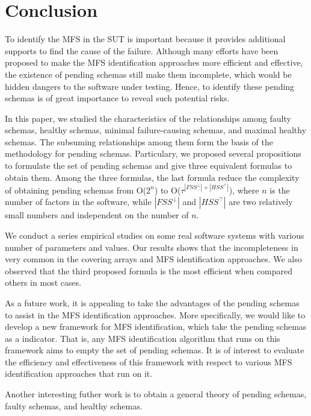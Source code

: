 {\section{Conclusion}\label{sec:conclusion}
To identify the MFS in the SUT is important because it provides additional supports to find the cause of the failure. Although many efforts have been proposed to make the MFS identification approaches more efficient and effective, the existence of pending schemas still make them incomplete, which would be hidden dangers to the software under testing. Hence, to identify these pending schemas is of great importance to reveal such potential risks.

In this paper, we studied the characteristics of the relationships among faulty schemas, healthy schemas, minimal failure-causing schemas, and maximal healthy schemas. The subsuming relationships among them form the basis of the methodology for pending schemas. Particulary, we proposed several propositions to formulate the set of pending schemas and give three equivalent formulas to obtain them. Among the three formulas, the last formula reduce the complexity of obtaining pending schemas from O($2^{n}$) to O($ \tau^{|FSS^{\bot}|+|HSS^{\top}|}$), where $n$ is the number of factors in the software, while $|FSS^{\bot}|$ and $|HSS^{\top}|$ are two relatively small numbers and independent on the number of $n$.

We conduct a series empirical studies on some real software systems with various number of parameters and values. Our results shows that the incompleteness in very common in the covering arrays and MFS identification approaches. We also observed that the third proposed formula is the most efficient when compared others in most cases.

As a future work, it is appealing to take the advantages of the pending schemas to assist in the MFS identification approaches. More specifically, we would like to develop a new framework for MFS identification, which take the pending schemas as a indicator. That is, any MFS identification algorithm that runs on this framework aims to empty the set of pending schemas. It is of interest to evaluate the efficiency and effectiveness of this framework with respect to various MFS identification approaches that run on it.

Another interesting futher work is to obtain a general theory of pending schemas, faulty schemas, and healthy schemas.

}

